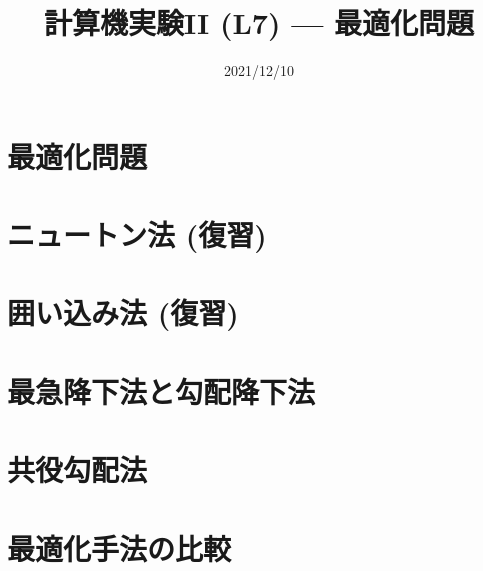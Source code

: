 \documentclass[10pt,dvipdfmx]{beamer}
\title{計算機実験II (L7) --- 最適化問題}
\date{2021/12/10}
\begin{document}
\begin{frame}
  \titlepage
  \tableofcontents
\end{frame}

\section{最適化問題}




\section{ニュートン法 (復習)}





\section{囲い込み法 (復習)}




\section{最急降下法と勾配降下法}



% 
% 

\section{共役勾配法}










\section{最適化手法の比較}







\end{document}
